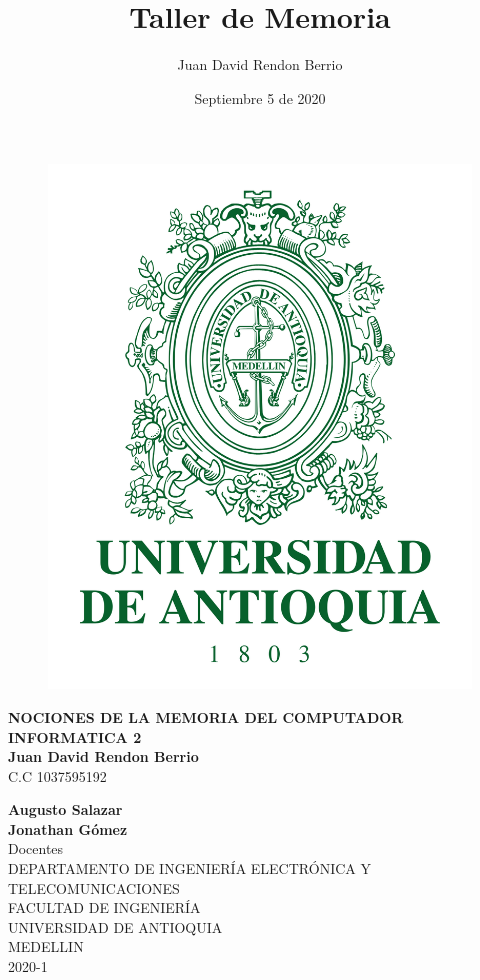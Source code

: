 \documentclass{article}
\title{Taller de Memoria}
\author{Juan David Rendon Berrio}
\date{Septiembre 5 de 2020}
\begin{document}
	
	\pagestyle{empty}
	
	
	\begin{figure}[h]
		\centering
		\includegraphics[scale=0.12]{images/escudoUdeA.png}
		\label{fig:my_label}
	\end{figure}
	
	\centering
	
	\textbf{\Large{NOCIONES DE LA MEMORIA DEL COMPUTADOR}}\\
	\vspace{1cm}
	\textbf{\Large{INFORMATICA 2}}\\
	\large
	\vspace{1.4cm}
	\textbf{Juan David Rendon Berrio}\\\vspace{0.1cm}C.C 1037595192 \\\vspace{1cm}      
	
	\textbf{Augusto Salazar}\\
	\vspace{0.2cm}
	\textbf{Jonathan Gómez}\\
	\vspace{0.2cm}\Large{Docentes}\\
	\vspace{1.4cm}
	\vfill
	\large{DEPARTAMENTO DE INGENIERÍA ELECTRÓNICA Y TELECOMUNICACIONES}\\
	\vspace{0.5cm}
	\large{FACULTAD DE INGENIERÍA}\\
	\large{UNIVERSIDAD DE ANTIOQUIA}\\
	\vspace{0.5cm}
	\large{MEDELLIN}\\
	\large{2020-1}\\
	
	
	
\end{document}
